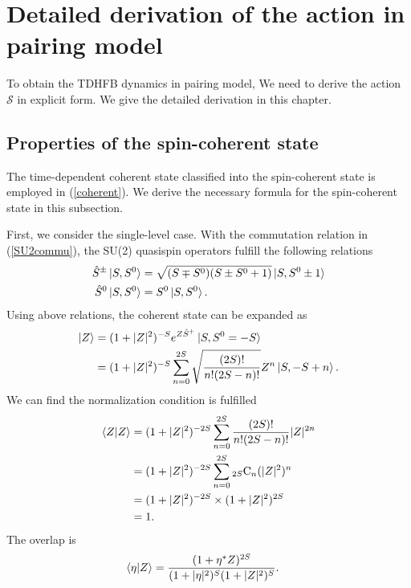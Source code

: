 \documentclass[11pt]{book} %
\begin{document}
\appendix


\chapter{Detailed derivation of the action in pairing model}
\label{derivation}
To obtain the TDHFB dynamics in pairing model, We need to derive the action $\mathcal{S}$ in explicit form. We give the detailed derivation in this chapter.

\section{Properties of the spin-coherent state}
\label{formula}
The time-dependent coherent state classified into the spin-coherent state is employed in (\ref{coherent}). We derive the necessary formula for the spin-coherent state in this subsection. \par
First, we consider the single-level case.
With the commutation relation in (\ref{SU2commu}), the SU(2) quasispin operators fulfill the following relations
\begin{align}
  \hat{S}^{\pm}\ket{S,S^0} &= \sqrt{(S\mp S^0)(S\pm S^0+1)} \ket{S,S^0\pm 1}
  \label{S_pm} \\
  \hat{S}^0\ket{S,S^0} &= S^0\ket{S,S^0} .
  \label{S_0}
\end{align}
Using above relations, the coherent state can be expanded as 
\begin{align}
  \ket{Z} &= (1+|Z|^2)^{-S}e^{Z \hat{S}^+}\ket{S,S^0=-S} \nonumber \\
  &= (1+|Z|^2)^{-S}\sum_{n=0}^{2S}\sqrt{\frac{(2S)!}{n!(2S-n)!}}Z^n\ket{S,-S+n} .
\end{align}
We can find the normalization condition is fulfilled
\begin{align}
  \braket{Z|Z} &= (1+|Z|^2)^{-2S}\sum_{n=0}^{2S}\frac{(2S)!}{n!(2S-n)!}|Z|^{2n} \nonumber \\
  &= (1+|Z|^2)^{-2S}\sum_{n=0}^{2S} {}_{2S}\mathrm{C}_n(|Z|^2)^n \nonumber \\
  &= (1+|Z|^2)^{-2S}\times(1+|Z|^2)^{2S} \nonumber \\
  &= 1 .
\end{align}
The overlap is
\begin{align}
  \braket{\eta|Z} &= \frac{(1+\eta^*Z)^{2S}}{(1+|\eta|^2)^S(1+|Z|^2)^S} .
\end{align}
\end{document}
